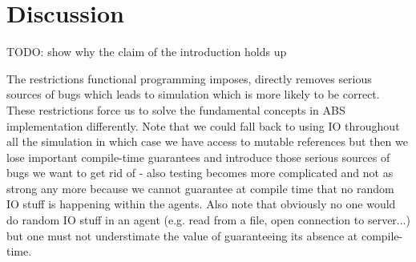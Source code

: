 \section{Discussion}
TODO: show why the claim of the introduction holds up

The restrictions functional programming imposes, directly removes serious sources of bugs which leads to simulation which is more likely to be correct. These restrictions force us to solve the fundamental concepts in ABS implementation differently. Note that we could fall back to using IO throughout all the simulation in which case we have access to mutable references but then we lose important compile-time guarantees and introduce those serious sources of bugs we want to get rid of - also testing becomes more complicated and not as strong any more because we cannot guarantee at compile time that no random IO stuff is happening within the agents. Also note that obviously no one would do random IO stuff in an agent (e.g. read from a file, open connection to server...) but one must not understimate the value of guaranteeing its absence at compile-time.